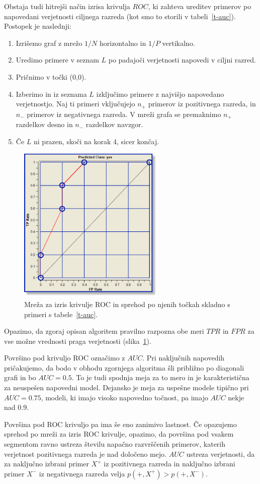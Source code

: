 Obstaja tudi hitrejši način izrisa krivulja $ROC$, ki zahteva ureditev primerov po napovedani verjetnosti ciljnega razreda (kot smo to storili v tabeli~\ref{t-auc}). Postopek je naslednji:
%
\begin{enumerate}
\item Izrišemo graf z mrežo $1/N$ horizontalno in $1/P$ vertikalno.
\item Uredimo primere v seznam $L$ po padajoči verjetnosti napovedi v ciljni razred.
\item Pričnimo v točki (0,0).
\item Izberimo in iz seznama $L$ izključimo primere z najvišjo napovedano verjetnostjo. Naj ti primeri vključujejo $n_+$ primerov iz pozitivnega razreda, in $n_-$ primerov iz negativnega razreda. V mreži grafa se premaknimo $n_+$ razdelkov desno in $n_-$ razdelkov navzgor.
\item Če $L$ ni prazen, skoči na korak 4, sicer končaj.
\end{enumerate}

\begin{figure}[htbp]
\begin{center}
\includegraphics[width=7cm]{slike/roc-walk.pdf}
\caption{Mreža za izris krivulje ROC in sprehod po njenih točkah skladno s primeri s tabele~\ref{t-auc}.}
\label{f-roc-walk}
\end{center}
\end{figure}

Opazimo, da zgoraj opisan algoritem pravilno razpozna obe meri $TPR$ in $FPR$ za vse možne vrednosti praga verjetnosti (slika~\ref{f-roc-walk}).

Površino pod krivuljo ROC označimo z $AUC$. Pri naključnih napovedih pričakujemo, da bodo v obhodu zgornjega algoritma šli približno po diagonali grafi in bo $AUC=0.5$. To je tudi spodnja meja za to mero in je karakteristična za neuspešen napovedni model. Dejansko je meja za uspešne modele tipično pri $AUC=0.75$, modeli, ki imajo visoko napovedno točnost, pa imajo $AUC$ nekje nad $0.9$.

Površina pod ROC krivuljo pa ima še eno zanimivo lastnost. Če opazujemo sprehod po mreži za izris ROC krivulje, opazimo, da površina pod vsakem segmentom ravno ustreza številu napačno razvrščenih primerov, katerih verjetnost pozitivnega razreda je nad določeno mejo. $AUC$ ustreza verjetnosti, da za naključno izbrani primer $X^+$ iz pozitivnega razreda in naključno izbrani primer $X^-$ iz negativnega razreda velja $p(+,X^+) > p(+, X^-)$.
